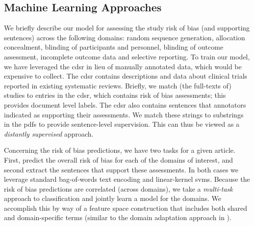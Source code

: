 \documentclass[runningheads,a4paper]{llncs}
\begin{document}

\subsection{Machine Learning Approaches}

We briefly describe our model for assessing the study risk of bias (and supporting sentences) across the following domains: random sequence generation, allocation concealment, blinding of participants and personnel, blinding of outcome assessment, incomplete outcome data and selective reporting.
To train our model, we have leveraged the \ac{cdsr} in lieu of manually annotated data, which would be expensive to collect.
The \ac{cdsr} contains descriptions and data about clinical trials reported in existing systematic reviews.
Briefly, we match (the full-texts of) studies to entries in the \ac{cdsr}, which contains risk of bias assessments; this provides document level labels.
The \ac{cdsr} also contains sentences that annotators indicated as supporting their assessments.
We match these strings to substrings in the \acp{pdf} to provide sentence-level supervision.
This can thus be viewed as a \emph{distantly supervised} \cite{mintz-09,nguyen-11} approach.

Concerning the risk of bias predictions, we have two tasks for a given article. First, predict the overall risk of bias for each of the domains of interest, and second extract the sentences that support these assessments.
In both cases we leverage standard bag-of-words text encoding and linear-kernel \acp{svm}.
Because the risk of bias predictions are correlated (across domains), we take a \emph{multi-task} \cite{evgeniou2004} approach to classification and jointly learn a model for the domains.
We accomplish this by way of a feature space construction that includes both shared and domain-specific terms (similar to the domain adaptation approach in \cite{daume2007}).
\end{document}
